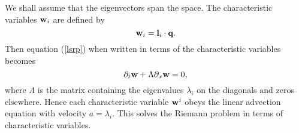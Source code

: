 \documentclass{article}
\begin{document}
%
%
%
\label{sec:linsys}
We shall assume that the eigenvectors span the space. The characteristic
variables ${\bf w}_i$ are defined by
\begin{equation}
  \label{charvar}
  {\bf w}_i = {\bf l}_i \cdot {\bf q}.
\end{equation}
\noindent Then equation (\ref{lsrp}) when written in terms of the
characteristic variables becomes
\begin{equation}
  \label{charvarrp}
  \partial_t {\bf w} + \Lambda \partial_x {\bf w} = 0,
\end{equation}
\noindent where $\Lambda$ is the matrix containing the eigenvalues
$\lambda_i$ on the diagonals and zeros elsewhere. Hence each
characteristic variable ${\bf w}^i$ obeys the linear advection
equation with velocity $a = \lambda_i$. This solves the Riemann
problem in terms of characteristic variables.
\end{document}
